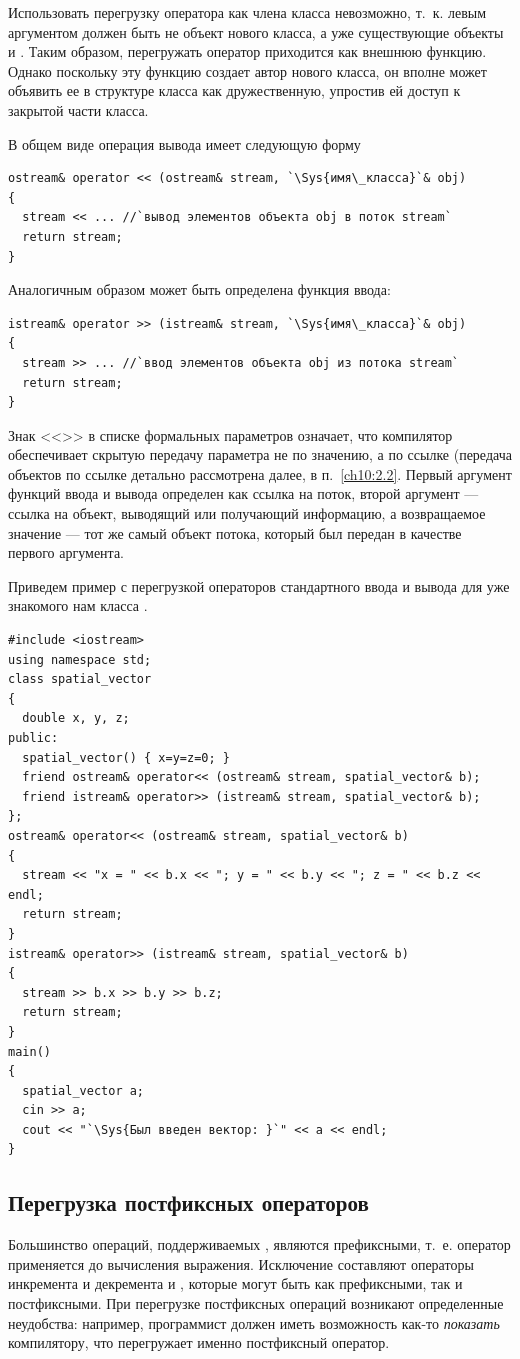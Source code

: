 Использовать перегрузку оператора как члена класса невозможно, т.~к. левым аргументом должен быть не объект нового
класса, а уже существующие объекты  и . Таким образом, перегружать
оператор приходится как внешнюю функцию. Однако поскольку эту функцию создает автор нового класса, он вполне может
объявить ее в структуре класса как дружественную, упростив ей доступ к закрытой части класса. 

В общем виде операция вывода имеет следующую форму 
\begin{lstlisting}
ostream& operator << (ostream& stream, `\Sys{имя\_класса}`& obj)
{
  stream << ... //`вывод элементов объекта obj в поток stream`
  return stream;
} 
\end{lstlisting}
Аналогичным образом может быть определена функция ввода: 
\begin{lstlisting}
istream& operator >> (istream& stream, `\Sys{имя\_класса}`& obj)
{
  stream >> ... //`ввод элементов объекта obj из потока stream`
  return stream;
} 
\end{lstlisting}

Знак <<\Sys{\&}>> в списке формальных параметров означает, что компилятор обеспечивает скрытую передачу
параметра не по значению, а по ссылке (передача объектов по ссылке детально рассмотрена далее, в п.~\ref{ch10:2.2}.  Первый
аргумент функций ввода и вывода определен как ссылка на поток, второй аргумент --- ссылка на объект, выводящий или
получающий информацию, а возвращаемое значение --- тот же самый объект потока, который был передан в качестве первого
аргумента.

Приведем пример с перегрузкой операторов стандартного ввода и вывода для уже знакомого нам класса . 
\begin{lstlisting}
#include <iostream>
using namespace std;
class spatial_vector 
{
  double x, y, z;
public:
  spatial_vector() { x=y=z=0; }
  friend ostream& operator<< (ostream& stream, spatial_vector& b);
  friend istream& operator>> (istream& stream, spatial_vector& b);  
};
ostream& operator<< (ostream& stream, spatial_vector& b) 
{
  stream << "x = " << b.x << "; y = " << b.y << "; z = " << b.z << endl;
  return stream;
} 
istream& operator>> (istream& stream, spatial_vector& b) 
{
  stream >> b.x >> b.y >> b.z;
  return stream;
} 
main() 
{
  spatial_vector a;
  cin >> a;
  cout << "`\Sys{Был введен вектор: }`" << a << endl;
}
\end{lstlisting}

\subsection[Перегрузка постфиксных операторов]{Перегрузка постфиксных операторов}
Большинство операций, поддерживаемых , являются префиксными, т.~е. оператор применяется до вычисления выражения.
Исключение составляют операторы инкремента и декремента \Sys{++} и \Sys{{}-{}-},
которые могут быть как префиксными, так и постфиксными. При перегрузке постфиксных операций возникают определенные
неудобства: например, программист должен иметь возможность как-то \emph{показать} компилятору,
что перегружает именно постфиксный оператор.

